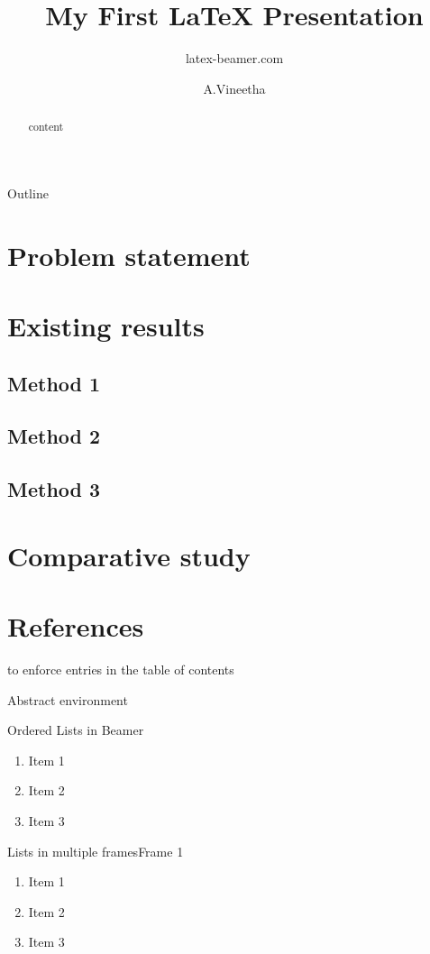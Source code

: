 \documentclass{beamer}
\title{My First \LaTeX{} Presentation}
\author{latex-beamer.com}
\institute{Online Beamer Tutorials}
\author{A.Vineetha}
\begin{document}
\begin{frame}
    \titlepage
\end{frame}

\begin{frame}{Outline}
  \tableofcontents
 \end{frame}

\section{Problem statement}
 \section{Existing results}
   \subsection{Method 1}
   \subsection{Method 2}
   \subsection{Method 3}
\section{Comparative study}
 \section*{References}

 \begin{frame}
 to enforce entries in the table of contents
\end{frame}

 Abstract environment
\begin{abstract}
  content
\end{abstract}

 \begin{frame}{Ordered Lists in Beamer}
\begin{enumerate}
    \item Item 1
    \item Item 2
    \item Item 3
\end{enumerate}
 \end{frame}

\begin{frame}{Lists in multiple frames}{Frame 1}
\begin{enumerate}
    \item Item 1
    \item Item 2
   \item Item 3
   \setcounter{currentenumi}{\theenumi}
\end{enumerate}
 \end{frame}
\end{document}
